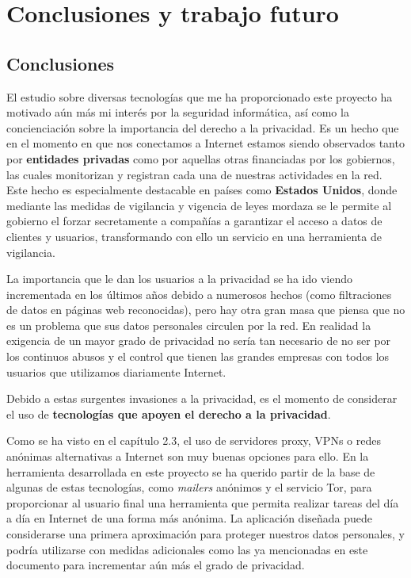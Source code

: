 \chapter{Conclusiones y trabajo futuro}
\label{chap:conclusiones}
\section{Conclusiones}
El estudio sobre diversas tecnologías que me ha proporcionado este
proyecto ha motivado aún más mi interés por la seguridad informática,
así como la concienciación sobre la importancia del derecho a la
privacidad.  Es un hecho que en el momento en que nos conectamos a
Internet estamos siendo observados tanto por \textbf{entidades
  privadas} como por aquellas otras financiadas por los gobiernos, las
cuales monitorizan y registran cada una de nuestras actividades en la
red. Este hecho es especialmente destacable en países como
\textbf{Estados Unidos}, donde mediante las medidas de vigilancia y
vigencia de leyes mordaza se le permite al gobierno el forzar
secretamente a compañías a garantizar el acceso a datos de clientes y
usuarios, transformando con ello un servicio en una herramienta de
vigilancia.

La importancia que le dan los usuarios a la privacidad se ha ido
viendo incrementada en los últimos años debido a numerosos hechos (como
filtraciones de datos en páginas web reconocidas), pero hay otra gran
masa que piensa que no es un problema que sus datos personales
circulen por la red.  En realidad la exigencia de un mayor grado de
privacidad no sería tan necesario de no ser por los continuos abusos y
el control que tienen las grandes empresas con todos los usuarios que
utilizamos diariamente Internet.

Debido a estas surgentes invasiones a la privacidad, es el momento de
considerar el uso de \textbf{tecnologías que apoyen el derecho a la
  privacidad}.

Como se ha visto en el capítulo 2.3, el uso de servidores proxy, VPNs
o redes anónimas alternativas a Internet son muy buenas opciones para
ello. En la herramienta desarrollada en este proyecto se ha querido
partir de la base de algunas de estas tecnologías, como
\textit{mailers }anónimos y el servicio Tor, para proporcionar al
usuario final una herramienta que permita realizar tareas del día a
día en Internet de una forma más anónima.  La aplicación diseñada
puede considerarse una primera aproximación para proteger nuestros
datos personales, y podría utilizarse con medidas adicionales como las
ya mencionadas en este documento para incrementar aún más el grado de
privacidad.


